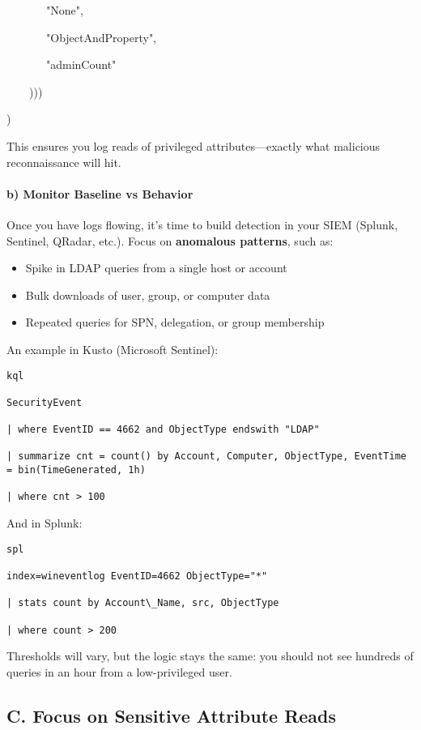 {{       "None",

       "ObjectAndProperty",

       "adminCount"

    )))

)

This ensures you log reads of privileged attributes—exactly what malicious reconnaissance will hit.

\paragraph{\textbf{   b) Monitor Baseline vs Behavior}}

Once you have logs flowing, it’s time to build detection in your SIEM (Splunk, Sentinel, QRadar, etc.). Focus on \textbf{anomalous patterns}, such as:

\begin{itemize}
    \item Spike in LDAP queries from a single host or account
    \item Bulk downloads of user, group, or computer data
    \item Repeated queries for SPN, delegation, or group membership
\end{itemize}

An example in Kusto (Microsoft Sentinel):
\begin{verbatim}
kql

SecurityEvent

| where EventID == 4662 and ObjectType endswith "LDAP"

| summarize cnt = count() by Account, Computer, ObjectType, EventTime = bin(TimeGenerated, 1h)

| where cnt > 100
\end{verbatim}

And in Splunk:
\begin{verbatim}
spl

index=wineventlog EventID=4662 ObjectType="*" 

| stats count by Account\_Name, src, ObjectType 

| where count > 200
\end{verbatim}

Thresholds will vary, but the logic stays the same: you should not see hundreds of queries in an hour from a low-privileged user.

\subsection{C. Focus on Sensitive Attribute Reads}

}}
